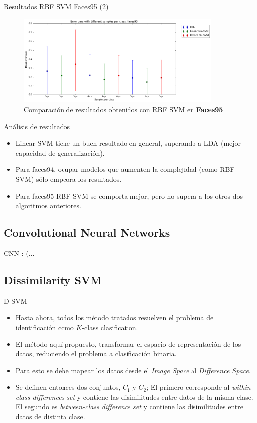 \documentclass{beamer}
\begin{document}
\begin{frame}{Resultados RBF SVM Faces95 (2)}
\begin{figure}[htpb!]
\centering
\includegraphics[width=10cm]{ksvm_rescomp95}
\caption{Comparación de resultados obtenidos con RBF SVM en \textbf{Faces95}}
\end{figure}
\end{frame}

\begin{frame}{Análisis de resultados}
\begin{itemize}
    \item Linear-SVM tiene un buen resultado en general, superando a LDA (mejor capacidad de generalización).
    \item Para faces94, ocupar modelos que aumenten la complejidad (como RBF SVM) sólo empeora los resultados.
    \item Para faces95 RBF SVM se comporta mejor, pero no supera a los otros dos algoritmos anteriores.
\end{itemize}
\end{frame}

\subsection{Convolutional Neural Networks}

\begin{frame}{CNN}
:-(...
\end{frame}




\subsection{Dissimilarity SVM}

\begin{frame}{D-SVM}
\begin{itemize}
    \item Hasta ahora, todos los método tratados resuelven el problema de identificación como
    $K$-class clasification.
    \item El método aquí propuesto, transformar el espacio de representación de los datos, reduciendo el problema
    a clasificación binaria.
    \item Para esto se debe mapear los datos desde el \textit{Image Space} al \textit{Difference Space}.
    \item Se definen entonces dos conjuntos, $C_1$ y $C_2$; El primero corresponde al \textit{within-class differences set} y contiene las disimilitudes entre datos de la misma clase. El segundo es \textit{between-class difference set} y contiene las disimilitudes entre datos de distinta clase.   
\end{itemize}
\end{frame}
\end{document}
